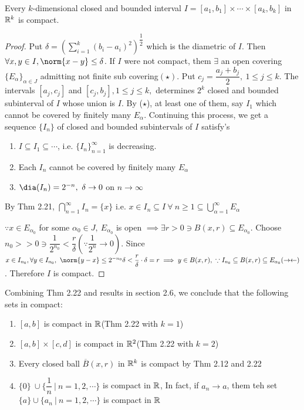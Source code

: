 \begin{thm}
	Every $k$-dimensional closed and bounded interval $I = [a_1,b_1] \times \cdots \times [a_k,b_k]$ in $\mathbb{R}^k$ is compact.
\end{thm}

\newpage

\begin{proof}
	Put $\delta = (\sum^{k}_{i=1}(b_i-a_i)^2)^{\dfrac{1}{2}}$ which is the diametric of $I$. Then $\forall x,y \in I, \norm{x - y} \leq \delta$. If $I$ were not compact, them $\exists$ an open covering $\{E_\alpha\}_{\alpha \in J}$ admitting not finite sub covering$(\star)$. Put $c_j = \dfrac{a_j+b_j}{2},~1\leq j \leq k$. The intervals $[a_j,c_j]$ and $[c_j,b_j], 1 \leq j \leq k,$ determines $2^k$ closed and bounded subinterval of $I$ whose union is $I$. By ($\star$), at least one of them, say $I_1$ which cannot be covered by finitely many $E_{\alpha}$. Continuing this process, we get a sequence $\{I_n\}$ of closed and bounded subintervals of $I$ satisfy's
	
	\begin{enumerate}[label = \alph*)]
		\item $I \subseteq I_1 \subseteq \cdots$, i.e. $\{I_n\}^{\infty}_{n=1}$ is decreasing.
		\item Each $I_n$ cannot be covered by finitely many $E_{\alpha}$
		\item $\dia (I_n) = 2^{-n},~\delta \rightarrow 0$ on $n \rightarrow \infty$
	\end{enumerate}
	By Thm 2.21, $\bigcap^{\infty}_{n=1}I_n = \{x\}$ i.e. $x \in I_n \subseteq I ~\forall~ n \geq 1 \subseteq \bigcup^{\infty}_{\alpha=1}E_{\alpha}$
	
	$\because x \in E_{\alpha_0}$ for some $\alpha_0 \in J,~E_{\alpha_0}$ is open $\implies \exists r>0 \ni B(x,r) \subseteq E_{\alpha_0}$. Choose $n_0 >> 0 \ni \dfrac{1}{2^{n_0}} < \dfrac{r}{\delta}(\because \dfrac{1}{2^n} \rightarrow 0)$. Since $x \in I_{n_0}, \forall y \in I_{n_0},~\norm{y - x} \leq 2^{-n_0}\delta < \dfrac{r}{\delta} \cdot \delta = r \implies y \in B(x,r),~\because I_{n_0} \subseteq B(x,r) \subseteq E_{\alpha_0}(\rightarrow\leftarrow)$. Therefore $I$ is compact. 
\end{proof}

Combining Thm 2.22 and results in section 2.6, we conclude that the following sets in compact:

\begin{enumerate}[wide,label = \roman*)]
	\item $[a,b]$ is compact in $\mathbb{R}$(Thm 2.22 with $k = 1$)
	\item $[a,b] \times [c,d]$ is compact in $\mathbb{R}^2$(Thm 2.22 with $k = 2$)
	\item Every closed ball $\overline{B}(x,r)$ in $\mathbb{R}^k$ is compact by Thm 2.12 and  2.22
	\item $\{0\} ~\cup\{\dfrac{1}{n}~|~n=1,2,\cdots\}$ is compact in $\mathbb{R}$, In fact, if $a_n \rightarrow a$, them teh set $\{a\} \cup \{a_n~|~n = 1,2,\cdots\}$ is compact in $\mathbb{R}$
\end{enumerate}


